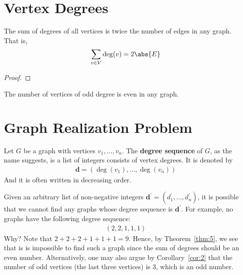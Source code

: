 \documentclass[thmcnt=section, 12pt, color=cyan]{my-elegantbook}
\begin{document}

\section{Vertex Degrees}


\begin{theorem} \label{thm:5}
	The sum of degrees of all vertices
	is twice the number of edges in any graph.
	That is, 
	\begin{align*}
		\sum_{v \in V} \deg(v) = 2 \abs{E}
	\end{align*}
\end{theorem}

\begin{proof}
\end{proof}

\begin{corollary} \label{cor:2}
	The number of vertices of odd degree is even
	in any graph.
\end{corollary}


\section{Graph Realization Problem}


Let $G$ be a graph with vertices $v_1, \ldots, v_n$.
The \textbf{degree sequence} of $G$, 
as the name suggests,
is a list of integers consists of vertex degrees.
It is denoted by 
\begin{align*}
	\mathbf{d} = (\deg(v_1), \ldots, \deg(v_n))
\end{align*}
And it is often written in decreasing order.

Given an arbitrary list of non-negative integers
$\mathbf{d}^\prime = (d_1^\prime, \ldots, d_n^\prime)$,
it is possible that 
we cannot find any graphs whose degree sequence
is $\mathbf{d}^\prime$.
For example, no graphs have the following degree sequence:
\begin{align*}
	(2, 2, 1, 1, 1)
\end{align*}
Why? Note that $2+2+2+1+1+1 = 9$.
Hence, by Theorem~\ref{thm:5}, we see that is is impossible to 
find such a graph since the sum of degrees should be an even number.
Alternatively, one may also argue by Corollary~\ref{cor:2}
that the number of odd vertices (the last three vertices)
is 3, which is an odd number.
\end{document}
